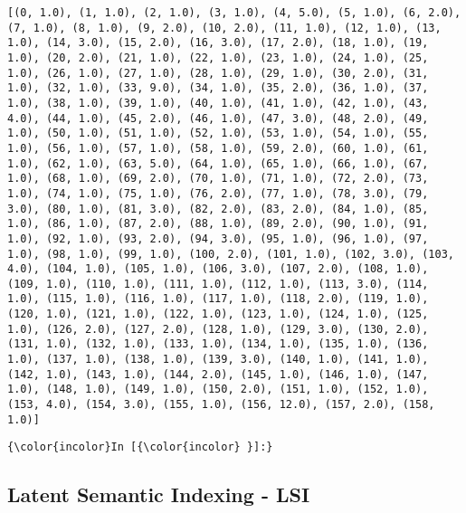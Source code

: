 \documentclass[11pt]{article}
\begin{document}
    \begin{Verbatim}[commandchars=\\\{\}]
[(0, 1.0), (1, 1.0), (2, 1.0), (3, 1.0), (4, 5.0), (5, 1.0), (6, 2.0), (7, 1.0), (8, 1.0), (9, 2.0), (10, 2.0), (11, 1.0), (12, 1.0), (13, 1.0), (14, 3.0), (15, 2.0), (16, 3.0), (17, 2.0), (18, 1.0), (19, 1.0), (20, 2.0), (21, 1.0), (22, 1.0), (23, 1.0), (24, 1.0), (25, 1.0), (26, 1.0), (27, 1.0), (28, 1.0), (29, 1.0), (30, 2.0), (31, 1.0), (32, 1.0), (33, 9.0), (34, 1.0), (35, 2.0), (36, 1.0), (37, 1.0), (38, 1.0), (39, 1.0), (40, 1.0), (41, 1.0), (42, 1.0), (43, 4.0), (44, 1.0), (45, 2.0), (46, 1.0), (47, 3.0), (48, 2.0), (49, 1.0), (50, 1.0), (51, 1.0), (52, 1.0), (53, 1.0), (54, 1.0), (55, 1.0), (56, 1.0), (57, 1.0), (58, 1.0), (59, 2.0), (60, 1.0), (61, 1.0), (62, 1.0), (63, 5.0), (64, 1.0), (65, 1.0), (66, 1.0), (67, 1.0), (68, 1.0), (69, 2.0), (70, 1.0), (71, 1.0), (72, 2.0), (73, 1.0), (74, 1.0), (75, 1.0), (76, 2.0), (77, 1.0), (78, 3.0), (79, 3.0), (80, 1.0), (81, 3.0), (82, 2.0), (83, 2.0), (84, 1.0), (85, 1.0), (86, 1.0), (87, 2.0), (88, 1.0), (89, 2.0), (90, 1.0), (91, 1.0), (92, 1.0), (93, 2.0), (94, 3.0), (95, 1.0), (96, 1.0), (97, 1.0), (98, 1.0), (99, 1.0), (100, 2.0), (101, 1.0), (102, 3.0), (103, 4.0), (104, 1.0), (105, 1.0), (106, 3.0), (107, 2.0), (108, 1.0), (109, 1.0), (110, 1.0), (111, 1.0), (112, 1.0), (113, 3.0), (114, 1.0), (115, 1.0), (116, 1.0), (117, 1.0), (118, 2.0), (119, 1.0), (120, 1.0), (121, 1.0), (122, 1.0), (123, 1.0), (124, 1.0), (125, 1.0), (126, 2.0), (127, 2.0), (128, 1.0), (129, 3.0), (130, 2.0), (131, 1.0), (132, 1.0), (133, 1.0), (134, 1.0), (135, 1.0), (136, 1.0), (137, 1.0), (138, 1.0), (139, 3.0), (140, 1.0), (141, 1.0), (142, 1.0), (143, 1.0), (144, 2.0), (145, 1.0), (146, 1.0), (147, 1.0), (148, 1.0), (149, 1.0), (150, 2.0), (151, 1.0), (152, 1.0), (153, 4.0), (154, 3.0), (155, 1.0), (156, 12.0), (157, 2.0), (158, 1.0)]

    \end{Verbatim}

    \begin{Verbatim}[commandchars=\\\{\}]
{\color{incolor}In [{\color{incolor} }]:} 
\end{Verbatim}

    \subsection{Latent Semantic Indexing -
LSI}\label{latent-semantic-indexing---lsi}
\end{document}
